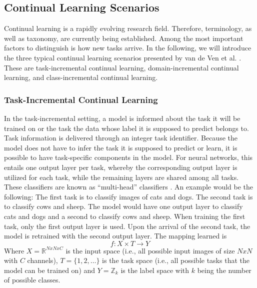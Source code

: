 \subsection{Continual Learning Scenarios}
\label{sec:ContinualLearningScenarios}
Continual learning is a rapidly evolving research field. Therefore, terminology, as well as taxonomy, are currently being established. Among the most
important factors to distinguish is how new tasks arrive. In the following, we will introduce the three typical continual learning scenarios
presented by van de Ven et al. \cite{van2022three}. These are task-incremental continual learning, domain-incremental continual learning, and
class-incremental continual learning.

\subsubsection{Task-Incremental Continual Learning}
\label{sec:TaskIncrementalContinualLearning}
In the task-incremental setting, a model is informed about the task it will be trained on or the task the data whose label it is supposed to predict belongs to.
Task information is delivered through an integer task identifier. Because the model does not have to infer the task it is supposed to predict
or learn, it is possible to have task-specific components in the model. For neural networks, this entails one output layer per task, whereby the corresponding
output layer is utilized for each task, while the remaining layers are shared among all tasks. These classifiers are known as \enquote{multi-head} classifiers
\cite{vandeven2019generative}. An example would be the following: The first task is to classify images of cats and dogs. The second task is to classify cows and sheep.
The model would have one output layer to classify cats and dogs and a second to classify cows and sheep. When training the first task, only the first output layer
is used. Upon the arrival of the second task, the model is retrained with the second output layer. The mapping learned is 
\begin{equation}
    f: X \times T \rightarrow Y
\end{equation}
Where $X = \mathbb{R}^{N x N x C}$ is the input space (i.e., all possible input images of size $N x N$ with $C$ channels), $T = \{1,2,\ldots\}$ is the task space (i.e., all possible
tasks that the model can be trained on) and $Y = \mathbb{Z}_{k}$ is the label space with $k$ being the number of possible classes.


